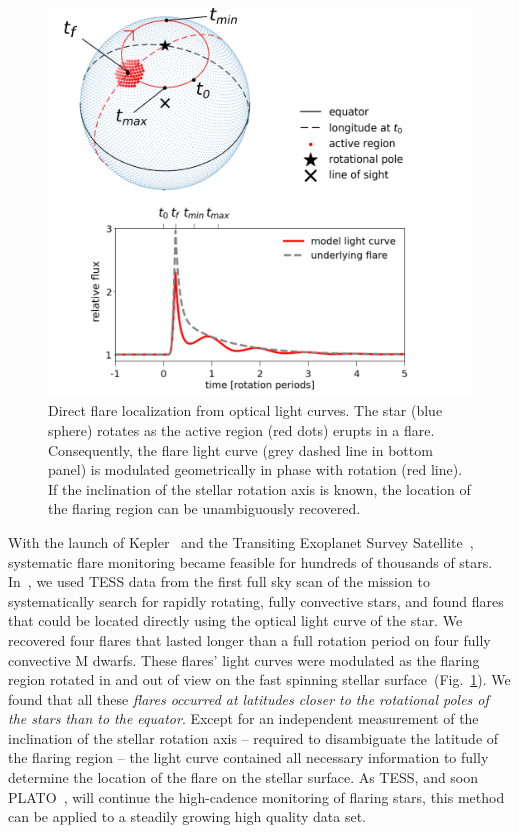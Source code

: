 \documentclass[proof]{WileyASNA-v1}
\newcommand{\jdag}[1]{\textcolor{darkred}{#1}}
\begin{document}
\begin{figure}
    \centering
    \includegraphics[width=\hsize]{model_illustration_annot_xmm_an2.png}
    \caption{Direct flare localization from optical light curves. The star (blue sphere) rotates as the active region (red dots) erupts in a flare. Consequently, the flare light curve (grey dashed line in bottom panel) is modulated geometrically in phase with rotation (red line). If the inclination of the stellar rotation axis is known, the location of the flaring region can be unambiguously recovered.}%
    \label{fig:ilin}
\end{figure}


With the launch of Kepler~\citep{borucki2010} and the Transiting Exoplanet Survey Satellite~\citep[TESS,][]{ricker2015}, systematic flare monitoring became feasible for hundreds of thousands of stars. In~\citet{ilin2021b}, we used TESS data from the first full sky scan of the mission to systematically search for rapidly rotating, fully convective stars, and found flares that could be located directly using the optical light curve of the star. 
We recovered four flares that lasted longer than a full rotation period on four fully convective M dwarfs.
These flares' light curves were modulated as the flaring region rotated in and out of view on the fast spinning stellar surface~(Fig.~\ref{fig:ilin}). We found that all these \textit{flares occurred at latitudes closer to the rotational poles of the stars than to the equator}.
Except for an independent measurement of the inclination of the stellar rotation axis -- required to disambiguate the latitude of the flaring region -- the light curve contained all necessary information to fully determine the location of the flare on the stellar surface.
As TESS, and soon PLATO~\citep{rauer2014}, will continue the high-cadence monitoring of flaring stars, this method can be applied to a steadily growing high quality data set.
\end{document}
